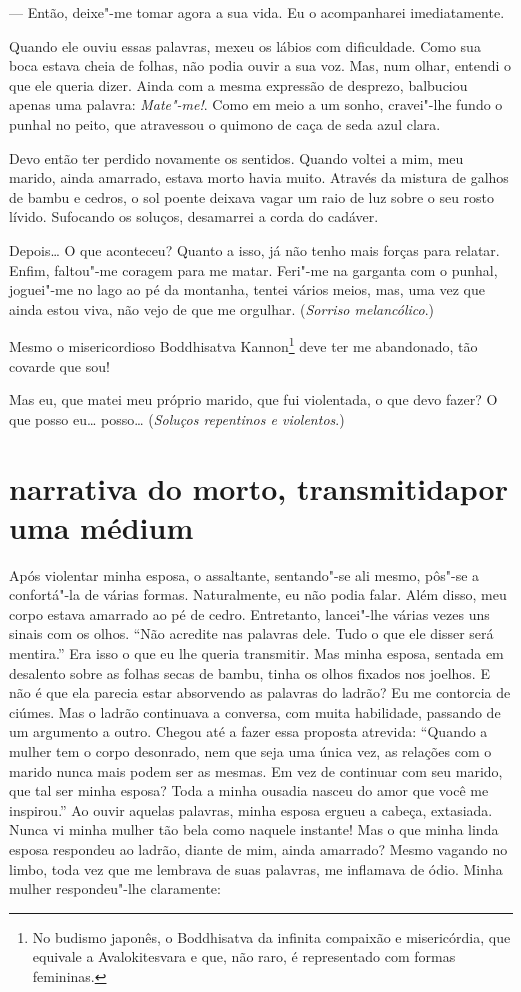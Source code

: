 --- Então, deixe"-me tomar agora a sua vida. Eu o acompanharei
imediatamente.

Quando ele ouviu essas palavras, mexeu os lábios com dificuldade. Como
sua boca estava cheia de folhas, não podia ouvir a sua voz. Mas, num
olhar, entendi o que ele queria dizer. Ainda com a mesma expressão de
desprezo, balbuciou apenas uma palavra: \textit{Mate"-me!}. Como em meio a um
sonho, cravei"-lhe fundo o punhal no peito, que atravessou o quimono de
caça de seda azul clara.

Devo então ter perdido novamente os sentidos. Quando voltei a mim, meu
marido, ainda amarrado, estava morto havia muito. Através da mistura de
galhos de bambu e cedros, o sol poente deixava vagar um raio de luz
sobre o seu rosto lívido. Sufocando os soluços, desamarrei a corda do cadáver.

Depois\ldots{} O que aconteceu? Quanto a isso, já não tenho mais forças para
relatar. Enfim, faltou"-me coragem para me matar. Feri"-me na garganta
com o punhal, joguei"-me no lago ao pé da montanha, tentei vários meios,
mas, uma vez que ainda estou viva, não vejo de que me orgulhar.
(\textit{Sorriso melancólico}.)

Mesmo o misericordioso Boddhisatva Kannon\footnote{ No budismo japonês,
o Boddhisatva da infinita compaixão e misericórdia, que equivale a
Avalokitesvara e que, não raro, é representado com formas femininas.}
deve ter me abandonado, tão covarde que sou!

Mas eu, que matei meu próprio marido, que fui violentada, o que devo
fazer? O que posso eu\ldots{} posso\ldots{} (\textit{Soluços repentinos e violentos}.)

\section*{narrativa do morto, transmitida\break por uma médium}

Após violentar minha esposa, o assaltante, sentando"-se ali mesmo,
pôs"-se a confortá"-la de várias formas. Naturalmente, eu não podia
falar. Além disso, meu corpo estava amarrado ao pé de cedro.
Entretanto, lancei"-lhe várias vezes uns sinais com os olhos. ``Não
acredite nas palavras dele. Tudo o que ele disser será mentira.'' Era
isso o que eu lhe queria transmitir. Mas minha esposa, sentada em
desalento sobre as folhas secas de bambu, tinha os olhos fixados nos
joelhos. E não é que ela parecia estar absorvendo as palavras do
ladrão? Eu me contorcia de ciúmes. Mas o ladrão continuava a conversa,
com muita habilidade, passando de um argumento a outro. Chegou até a
fazer essa proposta atrevida: ``Quando a mulher tem o corpo desonrado,
nem que seja uma única vez, as relações com o marido nunca mais podem
ser as mesmas. Em vez de continuar com seu marido, que tal ser minha
esposa? Toda a minha ousadia nasceu do amor que você me inspirou.'' Ao
ouvir aquelas palavras, minha esposa ergueu a cabeça, extasiada. Nunca
vi minha mulher tão bela como naquele instante! Mas o que minha linda
esposa respondeu ao ladrão, diante de mim, ainda amarrado? Mesmo
vagando no limbo, toda vez que me lembrava de suas palavras, me
inflamava de ódio. Minha mulher respondeu"-lhe claramente:

